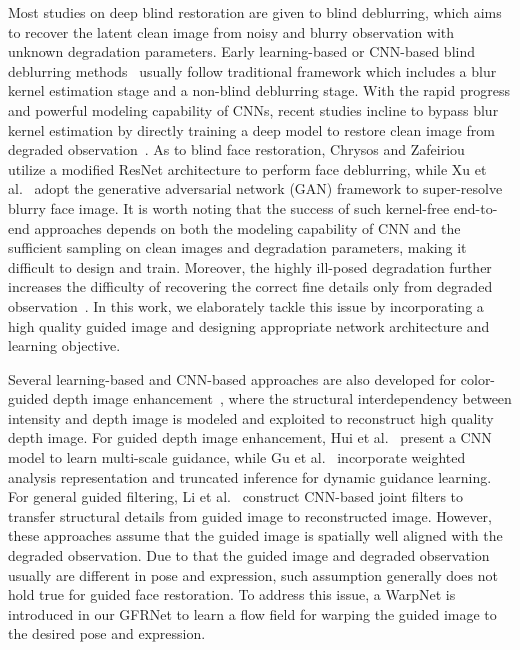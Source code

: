 \documentclass[runningheads]{llncs}
\begin{document}
Most studies on deep blind restoration are given to blind deblurring, which aims to recover the latent clean image from noisy and blurry observation with unknown degradation parameters.
Early learning-based or CNN-based blind deblurring methods~\cite{chakrabarti2016neural,schuler2016learning,xiao2016learning} usually follow traditional framework which includes a blur kernel estimation stage and a non-blind deblurring stage.
With the rapid progress and powerful modeling capability of CNNs, recent studies incline to bypass blur kernel estimation by directly training a deep model to restore clean image from degraded observation~\cite{Nah2017CVPR,DeblurGAN,nimisha2017blur,noroozi2017motion,hradivs2015convolutional}.
As to blind face restoration, Chrysos and Zafeiriou~\cite{chrysos2017deep} utilize a modified ResNet architecture to perform face deblurring, while Xu et al.~\cite{xu2017learning} adopt the generative adversarial network (GAN) framework to super-resolve blurry face image.
It is worth noting that the success of such kernel-free end-to-end approaches depends on both the modeling capability of CNN and the sufficient sampling on clean images and degradation parameters, making it difficult to design and train.
Moreover, the highly ill-posed degradation further increases the difficulty of recovering the correct fine details only from degraded observation~\cite{lin2008limits}.
In this work, we elaborately tackle this issue by incorporating a high quality guided image and designing appropriate network architecture and learning objective.


Several learning-based and CNN-based approaches are also developed for color-guided depth image enhancement~\cite{li2016deep,hui2016depth,gu2017learning}, where the structural interdependency between intensity and depth image is modeled and exploited to reconstruct high quality depth image.
For guided depth image enhancement, Hui et al.~\cite{hui2016depth} present a CNN model to learn multi-scale guidance, while Gu et al.~\cite{gu2017learning} incorporate weighted analysis representation and truncated inference for dynamic guidance learning.
For general guided filtering, Li et al.~\cite{li2016deep} construct CNN-based joint filters to transfer structural details from guided image to reconstructed image.
However, these approaches assume that the guided image is spatially well aligned with the degraded observation.
Due to that the guided image and degraded observation usually are different in pose and expression, such assumption generally does not hold true for guided face restoration.
To address this issue, a WarpNet is introduced in our GFRNet to learn a flow field for warping the guided image to the desired pose and expression.
\end{document}
